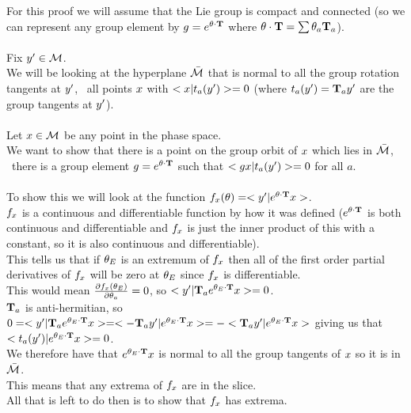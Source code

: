 {For this proof we will assume that the Lie group is compact and connected (so we can represent any group element by $g=e^{{\bf \theta} \cdot \mathbf{T}}$ where ${\bf \theta} \cdot \mathbf{T}=\sum {\bf \theta}_a \mathbf{T}_a$).\\
\\
\noindent Fix ${y'} \in {\cal M}$.\\
We will be looking at the hyperplane $\bar{{\cal M}}$ that is normal to all the group rotation tangents at ${y'}$, \ie\ all points $x$ with $<x|t_a({y'})>=0$ (where $t_a({y'})=\mathbf{T}_a {y'}$ are the group tangents at ${y'}$).\\
\\
Let $x \in {\cal M}$ be any point in the phase space.\\
We want to show that there is a point on the group orbit of $x$ which lies in $\bar{{\cal M}}$, \ie\ there is a group element $g=e^{{\bf \theta} \cdot \mathbf{T}}$ such that $<g x|t_a({y'})>=0$ for all $a$.\\
\\
To show this we will look at the function $f_{x}({\bf \theta})=<{y'}|e^{{\bf \theta} \cdot \mathbf{T}} x>$.\\
$f_{x}$ is a continuous and differentiable function by how it was defined ($e^{{\bf \theta} \cdot \mathbf{T}}$ is both continuous and differentiable and $f_{x}$ is just the inner product of this with a constant, so it is also continuous and differentiable).\\
This tells us that if ${\bf \theta}_E$ is an extremum of $f_{x}$ then all of the first order partial derivatives of $f_{x}$ will be zero at ${\bf \theta}_E$ since $f_{x}$ is differentiable.\\
This would mean $\frac{\partial f_{x}({\bf \theta}_E)}{\partial {\bf \theta}_a}=0$, so $<{y'}|\mathbf{T}_a e^{{\bf \theta}_E \cdot \mathbf{T}} x>=0$.\\
$\mathbf{T}_a$ is anti-hermitian, so $0=<{y'}|\mathbf{T}_a e^{{\bf \theta}_E \cdot \mathbf{T}} x>=<-\mathbf{T}_a {y'}|e^{{\bf \theta}_E \cdot \mathbf{T}} x>=-<\mathbf{T}_a {y'}|e^{{\bf \theta}_E \cdot \mathbf{T}} x>$ giving us that $<t_a({y'})|e^{{\bf \theta}_E \cdot \mathbf{T}} x>=0$.\\
We therefore have that $e^{{\bf \theta}_E \cdot \mathbf{T}} x$ is normal to all the group tangents of $x$ so it is in $\bar{{\cal M}}$.\\
This means that any extrema of $f_{x}$ are in the slice.\\
All that is left to do then is to show that $f_{x}$ has extrema.\\
\\
}

